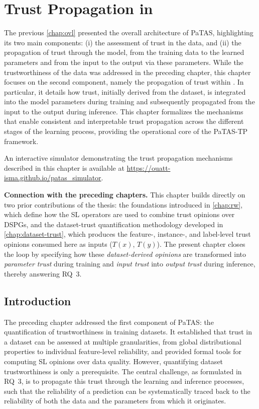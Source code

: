 \chapter{Trust Propagation in }
\label{chap:patas}
The previous \cref{chap:ovl} presented the overall architecture of \ac{PaTAS}, highlighting its two main components: (i) the assessment of trust in the data, and (ii) the propagation of trust through the model, from the training data to the learned parameters and from the input to the output via these parameters. While the trustworthiness of the data was addressed in the preceding chapter, this chapter focuses on the second component, namely the propagation of trust within . In particular, it details how trust, initially derived from the dataset, is integrated into the model parameters during training and subsequently propagated from the input to the output during inference. This chapter formalizes the mechanisms that enable consistent and interpretable trust propagation across the different stages of the learning process, providing the operational core of the \ac{PaTAS-TP} framework.

An interactive simulator demonstrating the trust propagation mechanisms described in this chapter is available at \url{https://ouatt-isma.github.io/patas_simulator}.
\begin{chapterlink}
\textbf{Connection with the preceding chapters.} This chapter builds directly on two prior contributions of the thesis: the  foundations introduced in \cref{chap:rw}, which define how the \ac{SL} operators are used to combine trust opinions over \aclp{DSPG}, and the dataset-trust quantification methodology developed in \cref{chap:dataset-trust}, which produces the feature-, instance-, and label-level trust opinions consumed here as inputs ($T(x)$, $T(y)$). The present chapter closes the loop by specifying how these \emph{dataset-derived opinions} are transformed into \emph{parameter trust} during training and \emph{input trust} into \emph{output trust} during inference, thereby answering \ac{RQ}~3.
\end{chapterlink}

\section{Introduction}
The preceding chapter addressed the first component of \ac{PaTAS}: the quantification of trustworthiness in training datasets. It established that trust in a dataset can be assessed at multiple granularities, from global distributional properties to individual feature-level reliability, and provided formal tools for computing \ac{SL} opinions over data quality. However, quantifying dataset trustworthiness is only a prerequisite. The central challenge, as formulated in \ac{RQ}~3, is to propagate this trust through the learning and inference processes, such that the reliability of a prediction can be systematically traced back to the reliability of both the data and the parameters from which it originates.

